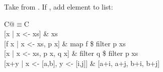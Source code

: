 \documentclass{refcard}
\newcommand{\la}{\textbackslash}
\begin{document}
Take  from . If , add element  to list:\\
\begin{tabular}{C@{\s$\equiv$\s}C}
	 \\[1ex]
	{[}x | x <- xs] & xs \\
	{[}f x | x <- xs, p x] & map f \$ filter p xs \\
	{[}x | x <- xs, p x, q x] & filter q \$ filter p xs \\
	{[}x+y | x <- [a,b], y <- [i,j]] & [a+i, a+j, b+i, b+j] \\
\end{tabular}




\end{document}
